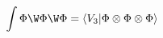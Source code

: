 \begin{equation}
	\int \Phi\W\Phi\W\Phi=\langle V_{3}\vert \Phi\otimes\Phi\otimes\Phi\rangle
\end{equation}

